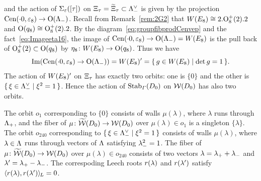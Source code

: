 \documentclass{amsart} %
\begin{document}
and the action of $\Sigma_{\varepsilon}([\tau])$ on  $\Xi_{\tau}=\widetilde{\Xi}_{\tau}\subset \Lambda_{-}^{\vee}$
is given by the projection 
$\mathrm{Cen}(\cdot 0, \varepsilon_{8})\to \mathord{\mathrm{O}}(\Lambda_{-})$.
Recall from Remark~\ref{rem:2G2} that $W(E_8)\cong 2.\mathord{\mathrm{O}}^{+}_8(2).2$ and $ \mathord{\mathrm{O}}(q_8)\cong \mathord{\mathrm{O}}^{+}_8(2).2$.
By the diagram~\eqref{eq:groupfibprodCenvep} and 
the fact~\eqref{eq:Imageeta16}, 
the image of $\mathrm{Cen}(\cdot 0, \varepsilon_{8})\to \mathord{\mathrm{O}}(\Lambda_{-})=W(E_8)$ is 
the pull back of $\mathord{\mathrm{O}}^{+}_8(2)\subset \mathord{\mathrm{O}}(q_8)$ by 
$\eta_8\colon W(E_8)\to \mathord{\mathrm{O}}(q_8)$.
Thus we have 
\[
\operatorname{Im}(\mathrm{Cen}(\cdot 0, \varepsilon_{8})\to \mathord{\mathrm{O}}(\Lambda_{-}) )=W(E_8)^{\prime}=\{\,{g\in W(E_8)}\mid {\det g=1} \,\}.
\]
The action of $W(E_8)^{\prime}$ on $\Xi_{\tau}$ has exactly two orbits:
one is 
$\{0\}$ and the other is $\{\,{\xi\in \Lambda_{-}^{\vee}}\mid {\xi^2=1} \,\}$.
Hence the action of $\operatorname{Stab}_{\varGamma}(D_0)$ on $\mathord{\mathcal{W}}(D_0)$ 
has also two orbits.
\par
The orbit $o_1$ corresponding to $\{0\}$
consists of walls $\mu(\lambda)$,
where $\lambda$ runs through $\Lambda_{+}$,
and the fiber of $\mu\colon \widetilde{\mathord{\mathcal{W}}}(D_0)\to\mathord{\mathcal{W}}(D_0)$ 
over $\mu(\lambda)\in o_1$  is a singleton $\{\lambda\}$.
The orbit $o_{240}$ corresponding to $\{\,{\xi\in \Lambda_{-}^{\vee}}\mid {\xi^2=1} \,\}$
consists of walls $\mu(\lambda)$,
where $\lambda\in \Lambda$ runs through
vectors of  $\Lambda$  satisfying ${\lambda}_{-}^2=1$.
The fiber of $\mu\colon \widetilde{\mathord{\mathcal{W}}}(D_0)\to\mathord{\mathcal{W}}(D_0)$ 
over $\mu(\lambda)\in o_{240}$ consists 
of two vectors
$\lambda={\lambda}_{+}+{\lambda}_{-}$ and $\lambda^{\prime}={\lambda}_{+}-{\lambda}_{-}$.
The correspoding Leech roots 
$r(\lambda)$ and $r(\lambda^{\prime})$  satisfy
$\langle r(\lambda), r(\lambda^{\prime}) \rangle_{\hskip -1pt L}=0$.
%
%
\end{document}
